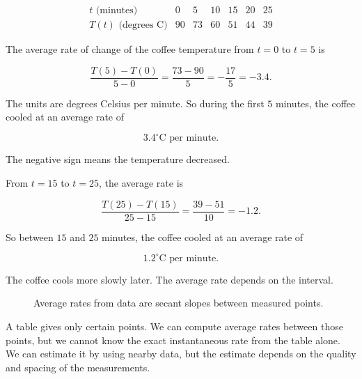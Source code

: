 \[
\begin{array}{c|cccccc}
t\text{ (minutes)} & 0 & 5 & 10 & 15 & 20 & 25 \\ \hline
T(t)\text{ (degrees C)} & 90 & 73 & 60 & 51 & 44 & 39
\end{array}
\]

The average rate of change of the coffee temperature from \(t=0\) to \(t=5\) is

\[
\frac{T(5)-T(0)}{5-0}
=
\frac{73-90}{5}
=
-\frac{17}{5}
=
-3.4.
\]

The units are degrees Celsius per minute.  So during the first \(5\) minutes, the coffee cooled at an average rate of

\[
3.4^\circ\text{C per minute}.
\]

The negative sign means the temperature decreased.

From \(t=15\) to \(t=25\), the average rate is

\[
\frac{T(25)-T(15)}{25-15}
=
\frac{39-51}{10}
=
-1.2.
\]

So between \(15\) and \(25\) minutes, the coffee cooled at an average rate of

\[
1.2^\circ\text{C per minute}.
\]

The coffee cools more slowly later.  The average rate depends on the interval.

\begin{figure}[h]
\centering
{}
\caption{Average rates from data are secant slopes between measured points.}
\label{fig:coffee-average-rates}
\end{figure}

A table gives only certain points.  We can compute average rates between those points, but we cannot know the exact instantaneous rate from the table alone.  We can estimate it by using nearby data, but the estimate depends on the quality and spacing of the measurements.

